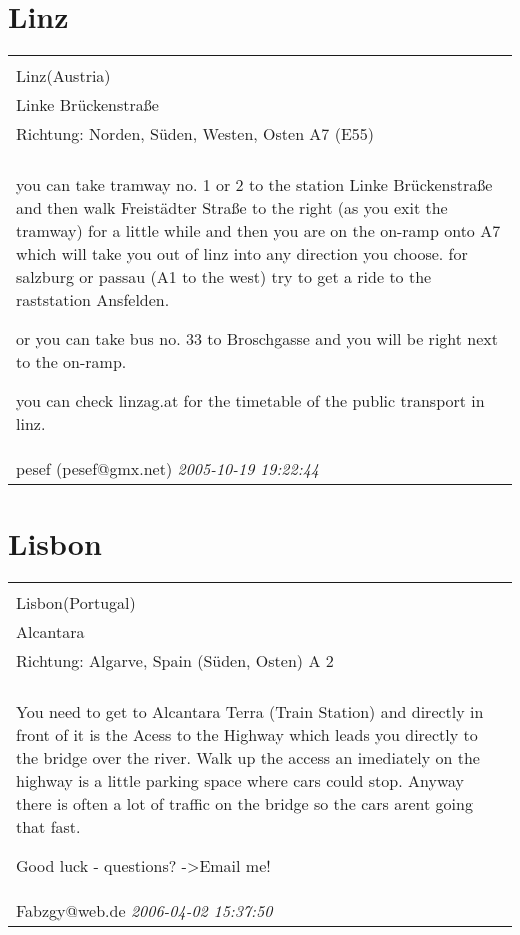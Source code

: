 \documentclass[a4paper,12pt]{article}
\begin{document}
\section{Linz}
\begin{tabular}{|p{13cm}|}
\hline\\
Linz(Austria)\\
Linke Brückenstraße\\
Richtung: Norden, Süden, Westen, Osten A7 (E55) \\
\hline\\
you can take tramway no. 1 or 2 to the station Linke Brückenstraße and then walk Freistädter Straße to the right (as you exit the tramway) for a little while and then you are on the on-ramp onto A7 which will take you out of linz into any direction you choose. for salzburg or passau (A1 to the west) try to get a ride to the raststation Ansfelden.

or you can take bus no. 33 to Broschgasse and you will be right next to the on-ramp.

you can check linzag.at for the timetable of the public transport in linz. \\
pesef (pesef@gmx.net) \textit{ 2005-10-19 19:22:44 }\\\hline
\end{tabular}


\section{Lisbon}
\begin{tabular}{|p{13cm}|}
\hline\\
Lisbon(Portugal)\\
Alcantara\\
Richtung: Algarve, Spain (Süden, Osten) A 2 \\
\hline\\
You need to get to Alcantara Terra (Train Station) and directly in front of it is the Acess to the Highway which leads you directly to the bridge over the river. Walk up the access an imediately on the highway is a little parking space where cars could stop. Anyway there is often a lot of traffic on the bridge so the cars arent going that fast.

Good luck - questions? ->Email me! \\
Fabzgy@web.de \textit{ 2006-04-02 15:37:50 }\\\hline
\end{tabular}
\end{document}

